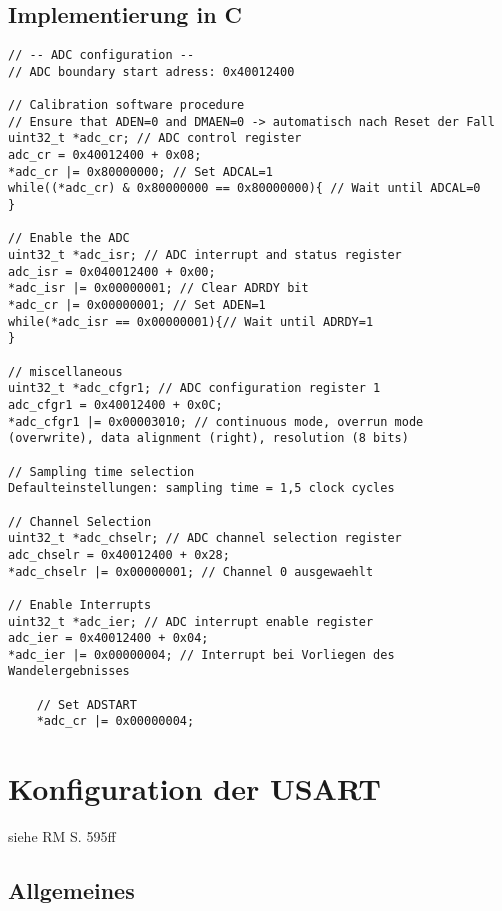 \documentclass[11pt]{report}
\begin{document}
		\subsection{Implementierung in C}
			\begin{lstlisting}
// -- ADC configuration --
// ADC boundary start adress: 0x40012400

// Calibration software procedure
// Ensure that ADEN=0 and DMAEN=0 -> automatisch nach Reset der Fall
uint32_t *adc_cr; // ADC control register
adc_cr = 0x40012400 + 0x08;
*adc_cr |= 0x80000000; // Set ADCAL=1
while((*adc_cr) & 0x80000000 == 0x80000000){ // Wait until ADCAL=0
}

// Enable the ADC
uint32_t *adc_isr; // ADC interrupt and status register
adc_isr = 0x040012400 + 0x00;
*adc_isr |= 0x00000001; // Clear ADRDY bit
*adc_cr |= 0x00000001; // Set ADEN=1
while(*adc_isr == 0x00000001){// Wait until ADRDY=1
}

// miscellaneous
uint32_t *adc_cfgr1; // ADC configuration register 1
adc_cfgr1 = 0x40012400 + 0x0C;
*adc_cfgr1 |= 0x00003010; // continuous mode, overrun mode (overwrite), data alignment (right), resolution (8 bits)

// Sampling time selection
Defaulteinstellungen: sampling time = 1,5 clock cycles

// Channel Selection
uint32_t *adc_chselr; // ADC channel selection register
adc_chselr = 0x40012400 + 0x28;
*adc_chselr |= 0x00000001; // Channel 0 ausgewaehlt

// Enable Interrupts
uint32_t *adc_ier; // ADC interrupt enable register
adc_ier = 0x40012400 + 0x04;
*adc_ier |= 0x00000004; // Interrupt bei Vorliegen des Wandelergebnisses

	// Set ADSTART
	*adc_cr |= 0x00000004;
			\end{lstlisting}
	\section{Konfiguration der USART}
		siehe RM S. 595ff
		\subsection{Allgemeines}
\end{document}
